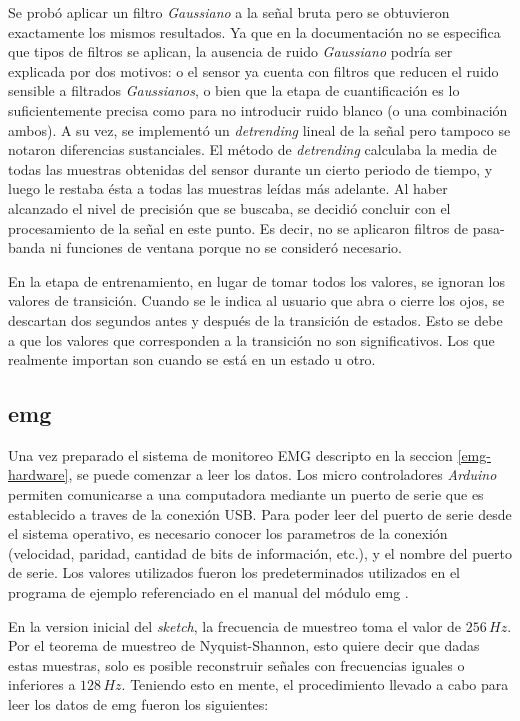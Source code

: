Se probó aplicar un filtro \emph{Gaussiano} a la señal bruta pero se obtuvieron exactamente los mismos resultados. Ya que en la documentación no se especifica que tipos de filtros se aplican, la ausencia de ruido \emph{Gaussiano} podría ser explicada por dos motivos: o el sensor ya cuenta con filtros que reducen el ruido sensible a filtrados \emph{Gaussianos}, o bien que la etapa de cuantificación es lo suficientemente precisa como para no introducir ruido blanco (o una combinación ambos). A su vez, se implementó un \emph{detrending} lineal de la señal pero tampoco se notaron diferencias sustanciales. El método de \emph{detrending} calculaba la media de todas las muestras obtenidas del sensor durante un cierto periodo de tiempo, y luego le restaba ésta a todas las muestras leídas más adelante. Al haber alcanzado el nivel de precisión que se buscaba, se decidió concluir con el procesamiento de la señal en este punto. Es decir, no se aplicaron filtros de pasa-banda ni funciones de ventana porque no se consideró necesario.
 
En la etapa de entrenamiento, en lugar de tomar todos los valores, se ignoran los valores de transición. Cuando se le indica al usuario que abra o cierre los ojos, se descartan dos segundos antes y después de la transición de estados. Esto se debe a que los valores que corresponden a la transición no son significativos. Los que realmente importan son cuando se está en un estado u otro.
 
\subsection{\acrshort{emg}} \label{sec:emg-signal-processing}

Una vez preparado el sistema de monitoreo EMG descripto en la seccion \ref{emg-hardware}, se puede comenzar a leer los datos. Los micro controladores \emph{Arduino} permiten comunicarse a una computadora mediante un puerto de serie que es establecido a traves de la conexión USB.  Para poder leer del puerto de serie desde el sistema operativo, es necesario conocer los parametros de la conexión (velocidad, paridad, cantidad de bits de información, etc.), y el nombre del puerto de serie. Los valores utilizados fueron los predeterminados utilizados en el programa de ejemplo referenciado en el manual del módulo \acrshort{emg} \cite{olimex-manual}.

En la version inicial del \emph{sketch}, la frecuencia de muestreo toma el valor de $256\, Hz$. Por el teorema de muestreo de Nyquist-Shannon, esto quiere decir que dadas estas muestras, solo es posible reconstruir señales con frecuencias iguales o inferiores a $128\, Hz$. Teniendo esto en mente, el procedimiento llevado a cabo para leer los datos de \acrshort{emg} fueron los siguientes:

